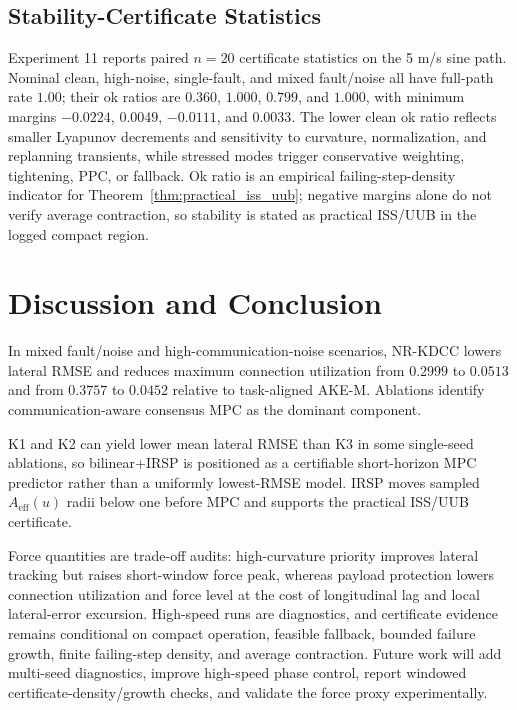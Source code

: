 \documentclass[letterpaper,journal]{IEEEtran}
\newcommand{\AKE}{AKE-M}
\newcommand{\Method}{NR-KDCC}
\begin{document}
\subsection{Stability-Certificate Statistics}

Experiment 11 reports paired $n=20$ certificate statistics on the 5 m/s sine path. Nominal clean, high-noise, single-fault, and mixed fault/noise all have full-path rate $1.00$; their ok ratios are $0.360$, $1.000$, $0.799$, and $1.000$, with minimum margins $-0.0224$, $0.0049$, $-0.0111$, and $0.0033$. The lower clean ok ratio reflects smaller Lyapunov decrements and sensitivity to curvature, normalization, and replanning transients, while stressed modes trigger conservative weighting, tightening, PPC, or fallback. Ok ratio is an empirical failing-step-density indicator for Theorem~\ref{thm:practical_iss_uub}; negative margins alone do not verify average contraction, so stability is stated as practical ISS/UUB in the logged compact region.

\section{Discussion and Conclusion}

In mixed fault/noise and high-communication-noise scenarios, \Method{} lowers lateral RMSE and reduces maximum connection utilization from $0.2999$ to $0.0513$ and from $0.3757$ to $0.0452$ relative to task-aligned \AKE{}. Ablations identify communication-aware consensus MPC as the dominant component.

K1 and K2 can yield lower mean lateral RMSE than K3 in some single-seed ablations, so bilinear+IRSP is positioned as a certifiable short-horizon MPC predictor rather than a uniformly lowest-RMSE model. IRSP moves sampled $A_{\mathrm{eff}}(u)$ radii below one before MPC and supports the practical ISS/UUB certificate.

Force quantities are trade-off audits: high-curvature priority improves lateral tracking but raises short-window force peak, whereas payload protection lowers connection utilization and force level at the cost of longitudinal lag and local lateral-error excursion. High-speed runs are diagnostics, and certificate evidence remains conditional on compact operation, feasible fallback, bounded failure growth, finite failing-step density, and average contraction. Future work will add multi-seed diagnostics, improve high-speed phase control, report windowed certificate-density/growth checks, and validate the force proxy experimentally.
\end{document}
